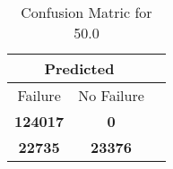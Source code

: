 \begin{table}[] 
\caption{Confusion Matric for 50.0} 
\label{Table: Prediction Accuracy-DMD50.0OnlySunEKF-resetReflectionperfectNoFailurePrediction-Reflection} 
\centering 
\begin{tabular} 
 {@{}ccc@{}} 
\toprule 
\multicolumn{2}{c}{\textbf{Predicted}}
 \\ \midrule 
\multicolumn{1}{|c|}{Failure} & 
\multicolumn{1}{c|}{No Failure}
 \\ \midrule 
\multicolumn{1}{|c|}{\color{green}\textbf{124017}} & 
\multicolumn{1}{c|}{\color{red}\textbf{0}}
 \\ \midrule 
\multicolumn{1}{|c|}{\color{red}\textbf{22735}} & 
\multicolumn{1}{c|}{\color{green}\textbf{23376}}
 \\ \bottomrule 
\end{tabular} 
\end{table} 
